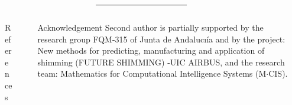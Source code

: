 \documentclass[final]{beamer}
\newlength{\sepmargin}
\newlength{\sepwid}
\newlength{\onecolwid}
\begin{document}
\begin{frame}[t]
\begin{columns}[t]
    \begin{column}{\sepmargin} \end{column}
  \end{columns}



  \vspace*{0.5cm}
  \begin{columns}[t]
    \begin{column}{\sepmargin}\end{column}
    \begin{column}{0.97\linewidth}
      {\color{blueMUW}\rule{1.012\textwidth}{10pt}}
    \end{column}
    \begin{column}{\sepmargin}\end{column}
  \end{columns}

  \vspace*{-1cm}
  \begin{columns}[t] %

    \begin{column}{\sepmargin} \end{column}
    \begin{column}{\onecolwid}
      \begin{block}{\large References}
        \vspace*{-0.5cm}
        \nocite{*} %
        {\footnotesize
          }
      \end{block}
    \end{column} %
    \begin{column}{\sepwid}  \end{column}

    \begin{column}{\onecolwid}
      \begin{block}{\large Acknowledgement}
        \vspace*{-0.5cm}
        \footnotesize Second author is partially supported by the research group FQM-315 of Junta de Andalucı\'ia and by the project: New methods for predicting, manufacturing and application of shimming (FUTURE SHIMMING) -UIC AIRBUS, and the research team: Mathematics for Computational Intelligence Systems (M$\cdot$CIS).
      \end{block}
      \vspace*{-0.5cm}


\end{column}
\end{columns}
\end{frame}
\end{document}
